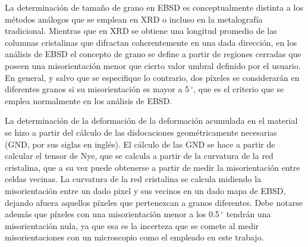 La determinación de tamaño de grano en EBSD es conceptualmente distinta a los métodos análogos que se emplean en XRD o incluso en la metalografía tradicional.
Mientras que en XRD se obtiene una longitud promedio de las columnas cristalinas que difractan coherentemente en una dada dirección, en los análisis de EBSD el concepto de grano se define a partir de regiones cerradas que poseen una misorientación menor que cierto valor umbral definido por el usuario.
En general, y salvo que se especifique lo contrario, dos píxeles se considerarán en diferentes granos si su misorientación es mayor a 5\,$^{\circ}$, que es el criterio que se emplea normalmente en los análisis de EBSD.

La determinación de la deformación de la deformación acumulada en el material se hizo a partir del cálculo de las dislocaciones geométricamente necesarias (GND, por sus siglas en inglés).
El cálculo de las GND se hace a partir de calcular el tensor de Nye\cite{Nye1953}, que se calcula a partir de la curvatura de la red cristalina, que a su vez puede obtenerse a partir de medir la misorientación entre celdas vecinas\cite{Pantleon2008}.
La curvatura de la red cristalina se calcula midiendo la misorientación entre un dado pixel y sus vecinos en un dado mapa de EBSD, dejando afuera aquellos píxeles que pertenezcan a granos diferentes.
Debe notarse además que píxeles con una misorientación menor a los 0.5\,$^{\circ}$ tendrán una misorientación nula, ya que esa es la incerteza que se comete al medir misorientaciones con un microscopio como el empleado en este trabajo.
